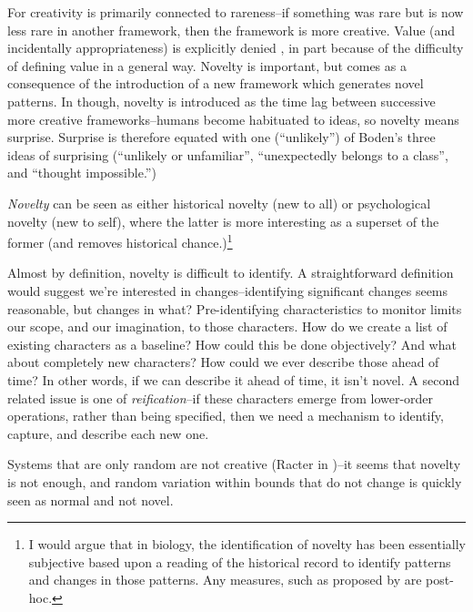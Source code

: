 For \textcite{Dorin2009} creativity is primarily connected to rareness--if something was rare but is now less rare in another framework, then the framework is more creative. Value (and incidentally appropriateness) is explicitly denied \parencite[p.18]{Dorin2009}, in part because of the difficulty of defining value in a general way. Novelty is important, but comes as a consequence of the introduction of a new framework which generates novel patterns. In \textcite[p.16]{Dorin2009} though, novelty is introduced as the time lag between successive more creative frameworks--humans become habituated to ideas, so novelty means surprise. Surprise is therefore equated with one (``unlikely'') of Boden's three ideas of surprising (``unlikely or unfamiliar'', ``unexpectedly belongs to a class'', and ``thought impossible.'')

\emph{Novelty} can be seen as either historical novelty (new to all) or psychological novelty (new to self), where the latter is more interesting as a superset of the former (and removes historical chance.)\footnote{I would argue that in biology, the identification of novelty has been essentially subjective based upon a reading of the historical record to identify patterns and changes in those patterns. Any measures, such as proposed by \textcite{McShea1998,Maynard-Smith:1995lw,Walker2012} are post-hoc.}

Almost by definition, novelty is difficult to identify. A straightforward definition would suggest we're interested in changes--identifying significant changes seems reasonable, but changes in what? Pre-identifying characteristics to monitor limits our scope, and our imagination, to those characters. How do we create a list of existing characters as a baseline? How could this be done objectively? And what about completely new characters? How could we ever describe those ahead of time? In other words, if we can describe it ahead of time, it isn't novel. A second related issue is one of \textit{reification}--if these characters emerge from lower-order operations, rather than being specified, then we need a mechanism to identify, capture, and describe each new one.

Systems that are only random are not creative (\eg Racter in \textcite[p.16]{Dorin2009})--it seems that novelty is not enough, and random variation within bounds that do not change is quickly seen as normal and not novel. 

